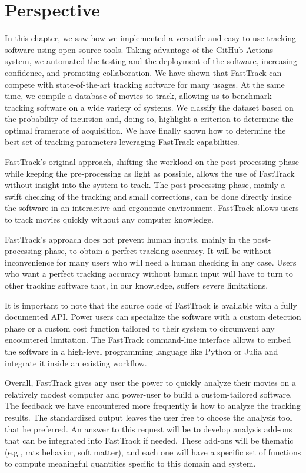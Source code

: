 \chapter{Perspective}

    In this chapter, we saw how we implemented a versatile and easy to use tracking software using open-source tools. Taking advantage of the GitHub Actions system, we automated the testing and the deployment of the software, increasing confidence, and promoting collaboration. We have shown that FastTrack can compete with state-of-the-art tracking software for many usages. At the same time, we compile a database of movies to track, allowing us to benchmark tracking software on a wide variety of systems. We classify the dataset based on the probability of incursion and, doing so, highlight a criterion to determine the optimal framerate of acquisition. We have finally shown how to determine the best set of tracking parameters leveraging FastTrack capabilities.

    FastTrack's original approach, shifting the workload on the post-processing phase while keeping the pre-processing as light as possible, allows the use of FastTrack without insight into the system to track. The post-processing phase, mainly a swift checking of the tracking and small corrections, can be done directly inside the software in an interactive and ergonomic environment. FastTrack allows users to track movies quickly without any computer knowledge.

    FastTrack's approach does not prevent human inputs, mainly in the post-processing phase, to obtain a perfect tracking accuracy. It will be without inconvenience for many users who will need a human checking in any case. Users who want a perfect tracking accuracy without human input will have to turn to other tracking software that, in our knowledge, suffers severe limitations.

    It is important to note that the source code of FastTrack is available with a fully documented API. Power users can specialize the software with a custom detection phase or a custom cost function tailored to their system to circumvent any encountered limitation. The FastTrack command-line interface allows to embed the software in a high-level programming language like Python or Julia and integrate it inside an existing workflow.

    Overall, FastTrack gives any user the power to quickly analyze their movies on a relatively modest computer and power-user to build a custom-tailored software. The feedback we have encountered more frequently is how to analyze the tracking results. The standardized output leaves the user free to choose the analysis tool that he preferred. An answer to this request will be to develop analysis add-ons that can be integrated into FastTrack if needed. These add-ons will be thematic (e.g., rats behavior, soft matter), and each one will have a specific set of functions to compute meaningful quantities specific to this domain and system.

